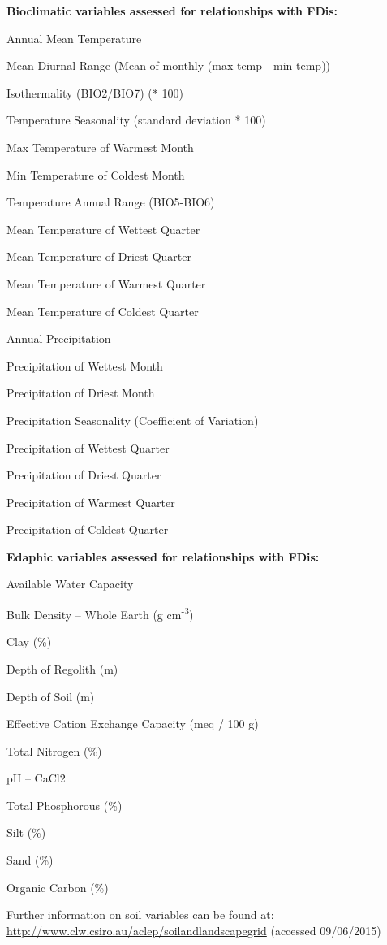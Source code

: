 \documentclass[openright,12pt,a4paper]{memoir}
\begin{document}
\textbf{Bioclimatic variables assessed for relationships with FDis:}

\small{Annual Mean Temperature

Mean Diurnal Range (Mean of monthly (max temp - min temp))

Isothermality (BIO2/BIO7) (* 100)

Temperature Seasonality (standard deviation * 100)

Max Temperature of Warmest Month

Min Temperature of Coldest Month

Temperature Annual Range (BIO5-BIO6)

Mean Temperature of Wettest Quarter

Mean Temperature of Driest Quarter

Mean Temperature of Warmest Quarter

Mean Temperature of Coldest Quarter

Annual Precipitation

Precipitation of Wettest Month

Precipitation of Driest Month

Precipitation Seasonality (Coefficient of Variation)

Precipitation of Wettest Quarter

Precipitation of Driest Quarter

Precipitation of Warmest Quarter

Precipitation of Coldest Quarter}

\newpage

\textbf{Edaphic variables assessed for relationships with FDis:}

\small{Available Water Capacity

Bulk Density – Whole Earth (g cm\textsuperscript{-3})

Clay (\%)

Depth of Regolith (m)

Depth of Soil (m)

Effective Cation Exchange Capacity (meq / 100 g)

Total Nitrogen (\%)

pH – CaCl2 

Total Phosphorous (\%)

Silt (\%)

Sand (\%)

Organic Carbon (\%)}

\newline
Further information on soil variables can be found at: \newline
\url{http://www.clw.csiro.au/aclep/soilandlandscapegrid} (accessed 09/06/2015)
\end{document}
